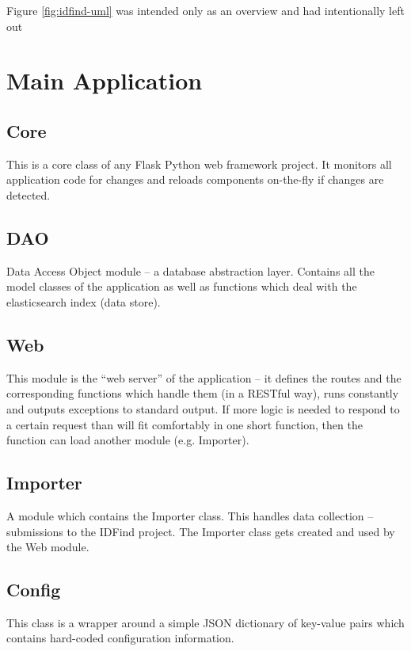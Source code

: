 Figure \ref{fig:idfind-uml} was intended only as an overview and had intentionally left out

\section{Main Application}
\label{design-main-first}

\subsection{Core}
This is a core class of any Flask Python web framework project. It monitors all application code for changes and reloads components on-the-fly if changes are detected.

\subsection{DAO}
Data Access Object module – a database abstraction layer. Contains all the model classes of the application as well as functions which deal with the elasticsearch index (data store).

\subsection{Web}
This module is the ``web server'' of the application – it defines the routes and the corresponding functions which handle them (in a RESTful way), runs constantly and outputs exceptions to standard output. If more logic is needed to respond to a certain request than will fit comfortably in one short function, then the function can load another module (e.g. Importer).

\subsection{Importer}
A module which contains the Importer class. This handles data collection – submissions to the IDFind project. The Importer class gets created and used by the Web module.

\subsection{Config}
This class is a wrapper around a simple JSON dictionary of key-value pairs which contains hard-coded configuration information.

